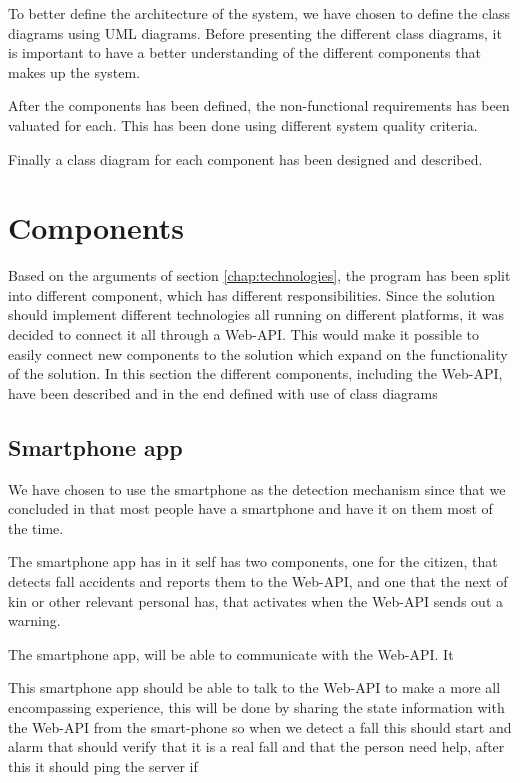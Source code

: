 To better define the architecture of the system, we have chosen to define the class diagrams using UML diagrams. Before presenting the different class diagrams, it is important to have a better understanding of the different components that makes up the system. 

After the components has been defined, the non-functional requirements has been valuated for each. This has been done using different system quality criteria.

Finally a class diagram for each component has been designed and described.

\section{Components}
Based on the arguments of section \ref{chap:technologies}, the program has been split into different component, which has different responsibilities. Since the solution should implement different technologies all running on different platforms, it was decided to connect it all through a Web-API. This would make it possible to easily connect new components to the solution which expand on the functionality of the solution. In this section the different components, including the Web-API, have been described and in the end defined with use of class diagrams

\subsection{Smartphone app}
We have chosen to use the smartphone as the detection mechanism since that we concluded in  that most people have a smartphone and have it on them most of the time. 

The smartphone app has in it self has two components, one for the citizen, that detects fall accidents and reports them to the Web-API, and one that the next of kin or other relevant personal has, that activates when the Web-API sends out a warning.

The smartphone app, will be able to communicate with the Web-API. It 

This smartphone app should be able to talk to the Web-API to make a more all encompassing experience, this will be done by sharing the state information with the Web-API from the smart-phone so when we detect a fall this should start and alarm that should verify that it is a real fall and that the person need help, after this it should ping the server if 

